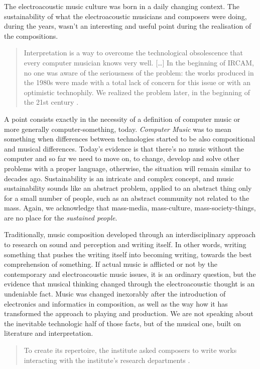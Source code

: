 \documentclass[twoside,a4paper]{article}
\begin{document}
The electroacoustic music culture was born in a daily changing context. The sustainability of what the electroacoustic musicians and composers were doing, during the years, wasn't an interesting and useful point during the realisation of the compositions.

\begin{quote}
Interpretation is a way to overcome the technological obsolescence that every computer musician knows very well. [\ldots] In the beginning of IRCAM, no one was aware of the seriousness of the problem: the works produced in the 1980s were made with a total lack of concern for this issue or with an optimistic technophily. We realized the problem later, in the beginning of the 21st century \cite{lem16}.
\end{quote}

A point consists exactly in the necessity of a definition of computer music or more generally computer-something, today. \emph{Computer Music} was to mean something when differences between technologies started to be also compositional and musical differences. Today's evidence is that there's no music without the computer and so far we need to move on, to change, develop and solve other problems with a proper language, otherwise, the situation will remain similar to decades ago. Sustainability is an intricate and complex concept, and music sustainability sounds like an abstract problem, applied to an abstract thing only for a small number of people, such as an abstract community not related to the mass. Again, we acknowledge that mass-media, mass-culture, mass-society-things, are no place for the \emph{sustained people}.

Traditionally, music composition developed through an interdisciplinary approach to research on sound and perception and writing itself. In other words, writing something that pushes the writing itself into becoming writing, towards the best comprehension of something. If actual music is afflicted or not by the contemporary and electroacoustic music issues, it is an ordinary question, but the evidence that musical thinking changed through the electroacoustic thought is an undeniable fact. Music was changed inexorably after the introduction of electronics and informatics in composition, as well as the way how it has transformed the approach to playing and production. We are not speaking about the inevitable technologic half of those facts, but of the musical one, built on literature and interpretation.

\begin{quote}
To create its repertoire, the institute asked composers to write works interacting with the institute’s research departments \cite{lem16}.
\end{quote}
\end{document}
